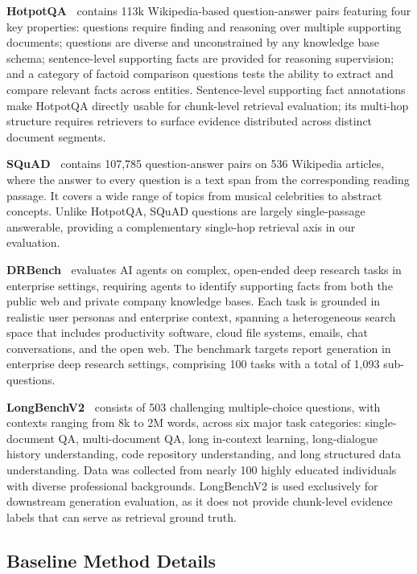 \documentclass{llmxive}
\begin{document}
\noindent
\textbf{HotpotQA~\cite{yang-etal-2018-hotpotqa}} contains 113k Wikipedia-based question-answer pairs featuring four key properties: questions require finding and reasoning over multiple supporting documents; questions are diverse and unconstrained by any knowledge base schema; sentence-level supporting facts are provided for reasoning supervision; and a category of factoid comparison questions tests the ability to extract and compare relevant facts across entities.  Sentence-level supporting fact annotations make HotpotQA directly usable for chunk-level retrieval evaluation; its multi-hop structure requires retrievers to surface evidence distributed across distinct document segments.

\noindent
\textbf{SQuAD~\cite{rajpurkar-etal-2016-squad}} contains 107,785 question-answer pairs on 536 Wikipedia articles, where the answer to every question is a text span from the corresponding reading passage.  It covers a wide range of topics from musical celebrities to abstract concepts. Unlike HotpotQA, SQuAD questions are largely single-passage answerable, providing a complementary single-hop retrieval axis in our evaluation.

\noindent
\textbf{DRBench~\cite{abaskohi2026drbench}} evaluates AI agents on complex, open-ended deep research tasks in enterprise settings, requiring agents to identify supporting facts from both the public web and private company knowledge bases. Each task is grounded in realistic user personas and enterprise context, spanning a heterogeneous search space that includes productivity software, cloud file systems, emails, chat conversations, and the open web. The benchmark targets report generation in enterprise deep research settings, comprising 100 tasks with a total of 1,093 sub-questions.

\noindent
\textbf{LongBenchV2~\cite{bai-etal-2025-longbench}} consists of 503 challenging multiple-choice questions, with contexts ranging from 8k to 2M words, across six major task categories: single-document QA, multi-document QA, long in-context learning, long-dialogue history understanding, code repository understanding, and long structured data understanding.  Data was collected from nearly 100 highly educated individuals with diverse professional backgrounds. LongBenchV2 is used exclusively for downstream generation evaluation, as it does not provide chunk-level evidence labels that can serve as retrieval ground truth.

\subsection{Baseline Method Details}
\label{app:baselines}
\end{document}
